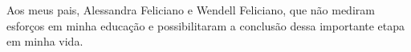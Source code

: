 \def\changemargin#1#2{\list{}{\rightmargin#2\leftmargin#1}\item[]}
\let\endchangemargin=\endlist 

\begin{changemargin}{8cm}{0cm}
  \begin{flushleft}
    \vspace*{0.75\textheight}
    
    Aos meus pais, Alessandra Feliciano e Wendell Feliciano, que não mediram esforços
    em minha educação e possibilitaram a conclusão dessa importante etapa em minha vida.
    
  \end{flushleft}
\end{changemargin}